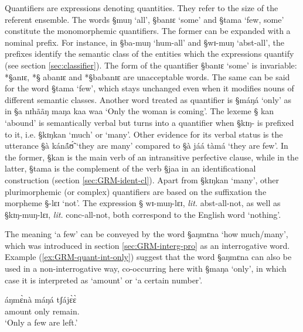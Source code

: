 Quantifiers are expressions denoting quantities. They refer to the size of the
referent ensemble. The words {\S muŋ} `all',   {\S banɪɛ} `some' and {\S tama}
`few, some' constitute the  monomorphemic quantifiers. The  former can be
expanded with a  nominal prefix. For instance, in {\S ba-muŋ} `{\sc hum}-all'
and {\S wɪ-muŋ} `{\sc abst}-all',  the prefixes identify the semantic class of
the entities which the expressions quantify (see section \ref{sec:classifier}). 
The form of the quantifier {\S banɪɛ} `some'  is  invariable: *{\S anɪɛ}, *{\S
abanɪɛ} and *{\S babanɪɛ} are unacceptable words.  The same can be said for the
word {\S tama}
`few', which stays unchanged even  when it  modifies  nouns of different
semantic classes.  Another word treated as quantifier is {\S máŋá} `only' as
in {\S a nɪhããŋ maŋa kaa waa} `Only the woman is coming'.  The  lexeme {\S
kan}
`abound' is semantically verbal but turns into a quantifier when {\S kɪŋ-}  is
prefixed to it, i.e.  {\S  kɪŋkan} `much' or `many'.  Other evidence for its
verbal status  is the utterance {\S à kánã́ʊ̃́} `they are many' compared to
{\S à jáá tàmá} `they are few'.  In the former, {\S kan} is the
main verb
of an intransitive perfective clause, while in the latter, {\S tama} is the
complement of the verb {\S jaa} in an identificational construction  (section
\ref{sec:GRM-ident-cl}). Apart from
{\S  kɪŋkan} `many',  other plurimorphemic (or complex) quantifiers are based on
the suffixation the morpheme {\S  -lɛɪ} `not'. The expression {\S
wɪ-muŋ-lɛɪ}, {\it lit.} {\sc abst}-all-not, as well as {\S kɪŋ-muŋ-lɛɪ},  {\it
lit.} {\sc conc}-all-not,  both correspond to the English word `nothing'. 

The meaning `a few' can be conveyed by  the word {\S aŋmɛna} `how
much/many', which was introduced in section \ref{sec:GRM-interg-pro} as an
interrogative
word. Example  
(\ref{ex:GRM-quant-int-only}) suggest that the word {\S aŋmɛna} can also be
used in a non-interrogative way,  co-occurring here with {\S maŋa} `only',  in
which case it is interpreted  as `amount' or `a certain number'.


\begin{exe}
 \ex\label{ex:GRM-quant-int-only}
\gll áŋmɛ̀nà máŋá tʃájɛ̀ɛ̀\\
   amount only remain.{\pfv}\\
\glt `Only a few are left.'
\end{exe}

